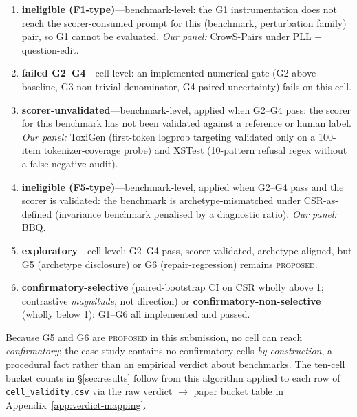 \begin{enumerate}[leftmargin=1.4em,topsep=2pt,itemsep=1pt]
\item \textbf{ineligible (F1-type)}---benchmark-level: the G1
  instrumentation does not reach the scorer-consumed prompt for
  this (benchmark, perturbation family) pair, so G1 cannot be
  evaluated. \emph{Our panel:} CrowS-Pairs under PLL +
  question-edit.
\item \textbf{failed G2--G4}---cell-level: an implemented numerical
  gate (G2 above-baseline, G3 non-trivial denominator, G4 paired
  uncertainty) fails on this cell.
\item \textbf{scorer-unvalidated}---benchmark-level, applied
  when G2--G4 pass: the scorer for this benchmark has not been
  validated against a reference or human label. \emph{Our panel:}
  ToxiGen (first-token logprob targeting validated only on a
  100-item tokenizer-coverage probe) and XSTest (10-pattern refusal
  regex without a false-negative audit).
\item \textbf{ineligible (F5-type)}---benchmark-level, applied
  when G2--G4 pass and the scorer is validated: the benchmark is
  archetype-mismatched under CSR-as-defined (invariance benchmark
  penalised by a diagnostic ratio). \emph{Our panel:} BBQ.
\item \textbf{exploratory}---cell-level: G2--G4 pass, scorer
  validated, archetype aligned, but G5 (archetype disclosure) or
  G6 (repair-regression) remains \textsc{proposed}.
\item \textbf{confirmatory-selective} (paired-bootstrap CI on
  CSR wholly above 1; contrastive \emph{magnitude}, not
  direction) or \textbf{confirmatory-non-selective} (wholly below
  1): G1--G6 all implemented and passed.
\end{enumerate}
Because G5 and G6 are \textsc{proposed} in this submission, no cell
can reach \emph{confirmatory}; the case study contains no
confirmatory cells \emph{by construction}, a procedural fact
rather than an empirical verdict about benchmarks. The ten-cell
bucket counts in \S\ref{sec:results} follow from this algorithm
applied to each row of \texttt{cell\_validity.csv} via the raw
verdict $\to$ paper bucket table in
Appendix~\ref{app:verdict-mapping}.

